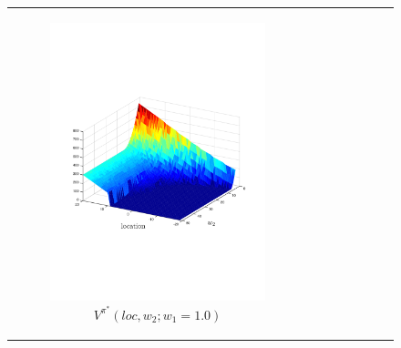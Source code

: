 \documentclass[letterpaper]{article}
\begin{document}
{\centering
    \begin{figure}[]
        \begin{tabular}{cc}
            \begin{subfigure}{0.45\columnwidth}
                \centering
                \includegraphics[width=\textwidth]{images/robot_vf_new}
                \caption{{\footnotesize $V^{\pi^{*}}(loc, w_2; w_1 = 1.0)$}}
                \label{fig:navigation_vf}
            \end{subfigure} &
            \begin{subfigure}{0.45\columnwidth}
                \centering

\end{subfigure}
\end{tabular}
\end{figure}}
\end{document}
